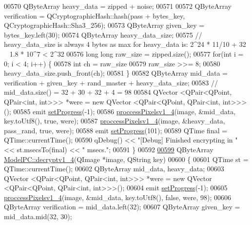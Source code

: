 \begin{DoxyCode}
00570     QByteArray heavy\_data = zipped + noise;
00571 
00572     QByteArray verification = QCryptographicHash::hash(pass + bytes\_key, QCryptographicHash::Sha3\_256);
00573     QByteArray given\_key = bytes\_key.left(30);
00574     QByteArray heavy\_data\_size;
00575     \textcolor{comment}{// heavy\_data\_size is always 4 bytes as max for heavy\_data is: 2^24 * 11/10 + 32 ~ 1.8 * 10^7 < 2^32}
00576     \textcolor{keywordtype}{long} \textcolor{keywordtype}{long} raw\_size = zipped.size();
00577     \textcolor{keywordflow}{for}(\textcolor{keywordtype}{int} i = 0; i < 4; i++) \{
00578         \textcolor{keywordtype}{int} ch = raw\_size %
00579         raw\_size >>= 8;
00580         heavy\_data\_size.push\_front(ch);
00581     \}
00582     QByteArray mid\_data = verification + given\_key + rand\_master + heavy\_data\_size;
00583     \textcolor{comment}{// mid\_data.size() = 32 + 30 + 32 + 4 = 98}
00584     QVector <QPair<QPoint, QPair<int, int>>> *were = \textcolor{keyword}{new} QVector <QPair<QPoint, QPair<int, int>>>();
00585     emit \hyperlink{class_model_p_c_afdcd80f0ed5062e145a71f09b0897547}{setProgress}(-1);
00586     \hyperlink{class_model_p_c_a5cdb4d1d61ff62ee9d45b496a7dbf1fb}{proccessPixelsv1\_4}(image, &mid\_data, key.toUtf8(), \textcolor{keyword}{true}, were);
00587     \hyperlink{class_model_p_c_a5cdb4d1d61ff62ee9d45b496a7dbf1fb}{proccessPixelsv1\_4}(image, &heavy\_data, pass\_rand, \textcolor{keyword}{true}, were);
00588     emit \hyperlink{class_model_p_c_afdcd80f0ed5062e145a71f09b0897547}{setProgress}(101);
00589     QTime \textcolor{keyword}{final} = QTime::currentTime();
00590     qDebug() << \textcolor{stringliteral}{"[Debug] Finished encrypting in "} << st.msecsTo(\textcolor{keyword}{final}) << \textcolor{stringliteral}{" msecs."};
00591 \}
00592 
\hypertarget{modelpc_8cpp_source_l00599}{}\hyperlink{class_model_p_c_a7a1f7d491e1bde16936190b9e90896b0}{00599} QByteArray \hyperlink{class_model_p_c_a7a1f7d491e1bde16936190b9e90896b0}{ModelPC::decryptv1\_4}(QImage *image, QString key)
00600 \{
00601     QTime st = QTime::currentTime();
00602     QByteArray mid\_data, heavy\_data;
00603     QVector <QPair<QPoint, QPair<int, int>>> *were = \textcolor{keyword}{new} QVector <QPair<QPoint, QPair<int, int>>>();
00604     emit \hyperlink{class_model_p_c_afdcd80f0ed5062e145a71f09b0897547}{setProgress}(-1);
00605     \hyperlink{class_model_p_c_a5cdb4d1d61ff62ee9d45b496a7dbf1fb}{proccessPixelsv1\_4}(image, &mid\_data, key.toUtf8(), \textcolor{keyword}{false}, were, 98);
00606     QByteArray verification = mid\_data.left(32);
00607     QByteArray given\_key = mid\_data.mid(32, 30);

\end{DoxyCode}

